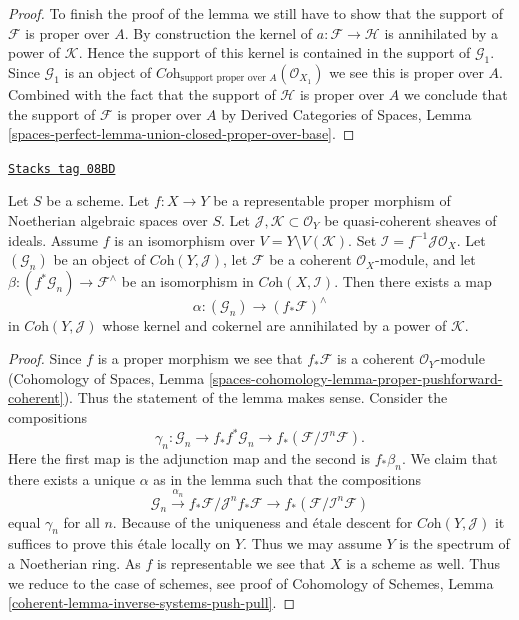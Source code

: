 \begin{proof}
\medskip\noindent
To finish the proof of the lemma we still have to show that the
support of $\mathcal{F}$ is proper over $A$.
By construction the kernel of $a : \mathcal{F} \to \mathcal{H}$
is annihilated by a power of $\mathcal{K}$. Hence the support of
this kernel is contained in the support of $\mathcal{G}_1$. Since
$\mathcal{G}_1$ is an object of
$\textit{Coh}_{\text{support proper over } A}(\mathcal{O}_{X_1})$
we see this is proper over $A$. Combined with the fact that the
support of $\mathcal{H}$ is proper over $A$ we conclude that the
support of $\mathcal{F}$ is proper over $A$ by
Derived Categories of Spaces, Lemma
\ref{spaces-perfect-lemma-union-closed-proper-over-base}.
\end{proof}

\begin{lemma}
\label{spaces-more-morphisms-lemma-inverse-systems-push-pull}
\href{https://stacks.math.columbia.edu/tag/08BD}{\texttt{Stacks tag 08BD}}

Let $S$ be a scheme. Let $f : X \to Y$ be a representable
proper morphism of Noetherian algebraic spaces over $S$. Let
$\mathcal{J}, \mathcal{K} \subset \mathcal{O}_Y$
be quasi-coherent sheaves of ideals.
Assume $f$ is an isomorphism over $V = Y \setminus V(\mathcal{K})$.
Set $\mathcal{I} = f^{-1}\mathcal{J} \mathcal{O}_X$.
Let $(\mathcal{G}_n)$ be an object of $\textit{Coh}(Y, \mathcal{J})$,
let $\mathcal{F}$ be a coherent $\mathcal{O}_X$-module, and let
$\beta : (f^*\mathcal{G}_n)  \to \mathcal{F}^\wedge$ be an isomorphism in
$\textit{Coh}(X, \mathcal{I})$. Then there exists a map
$$
\alpha :
(\mathcal{G}_n)
\longrightarrow
(f_*\mathcal{F})^\wedge
$$
in $\textit{Coh}(Y, \mathcal{J})$ whose kernel and cokernel
are annihilated by a power of $\mathcal{K}$.
\end{lemma}

\begin{proof}
Since $f$ is a proper morphism we see that $f_*\mathcal{F}$ is a coherent
$\mathcal{O}_Y$-module (Cohomology of Spaces, Lemma
\ref{spaces-cohomology-lemma-proper-pushforward-coherent}).
Thus the statement of the lemma makes sense. Consider the compositions
$$
\gamma_n : \mathcal{G}_n \to
f_*f^*\mathcal{G}_n \to
f_*(\mathcal{F}/\mathcal{I}^n\mathcal{F}).
$$
Here the first map is the adjunction map and the second is $f_*\beta_n$.
We claim that there exists a unique $\alpha$ as in the lemma
such that the compositions
$$
\mathcal{G}_n \xrightarrow{\alpha_n}
f_*\mathcal{F}/\mathcal{J}^nf_*\mathcal{F} \to
f_*(\mathcal{F}/\mathcal{I}^n\mathcal{F})
$$
equal $\gamma_n$ for all $n$. Because of the uniqueness and \'etale
descent for $\textit{Coh}(Y, \mathcal{J})$ it suffices
to prove this \'etale locally on $Y$. Thus we may assume $Y$
is the spectrum of a Noetherian ring. As $f$ is representable
we see that $X$ is a scheme as well. Thus we reduce to the case of
schemes, see proof of
Cohomology of Schemes, Lemma \ref{coherent-lemma-inverse-systems-push-pull}.
\end{proof}


